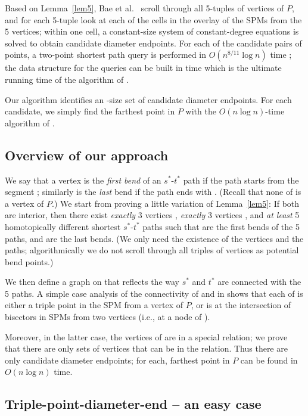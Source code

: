 \documentclass{llncs}
\newcommand{\e}[1]{\emph{#1}}
\renewcommand\-{\textrm{-}}
\renewcommand{\O}[1]{\ensuremath{O(#1 \log n)}\xspace}
\renewcommand\P{\ensuremath{P}\xspace}
\renewcommand\ss{\ensuremath{s^*}\xspace}
\renewcommand\tt{\ensuremath{t^*}\xspace}
\newcommand\bae{\cite{bae}\xspace}
\begin{document}
Based on Lemma~\ref{lem5}, Bae et al.\ \bae scroll through all 5-tuples of vertices of \P, and for each 5-tuple look at each of the  cells in the overlay of the SPMs from the 5 vertices; within one cell, a constant-size system of constant-degree equations is solved to obtain candidate diameter endpoints. For each of the  candidate pairs of points, a two-point shortest path query is performed in \O{n^{8/11}} time \cite{2point}; the data structure for the queries can be built in  time which is the ultimate running time of the algorithm of \bae.

Our algorithm identifies an -size set of candidate diameter endpoints. For each candidate, we simply find the farthest point in \P with the \O{n}-time algorithm of \cite{hs}.


\subsection{Overview of our approach}

We say that a vertex  is the \e{first bend} of an \ss-\tt path if the path
starts from the segment ; similarly  is the \e{last} bend if the path
ends with . (Recall that none of  is a vertex of \P.) We start from
proving a little variation of Lemma~\ref{lem5}: If both  are interior,
then there exist \e{exactly} 3 vertices , \e{exactly} 3
vertices , and \e{at least} 5 homotopically different shortest
\ss-\tt paths such that  are the first bends of the 5 paths,
and  are the last bends. (We only need the existence of the
vertices and the paths; algorithmically we do not scroll through all triples of
vertices as potential bend points.)

We then define a graph  on  that reflects
the way \ss and \tt are connected with the 5 paths. A simple case analysis of
the connectivity of  and  in  shows
that each of  is either a triple point in the SPM from a vertex of \P,
or is at the intersection of bisectors in SPMs from two vertices (i.e., at a
node of ).

Moreover, in the latter case, the vertices of  are in a special relation; we prove that there are only  sets of vertices that can be in the relation. Thus there are only  candidate diameter endpoints; for each, farthest point in \P can be found in \O{n} time.

\subsection{Triple-point-diameter-end -- an easy case}
\end{document}
